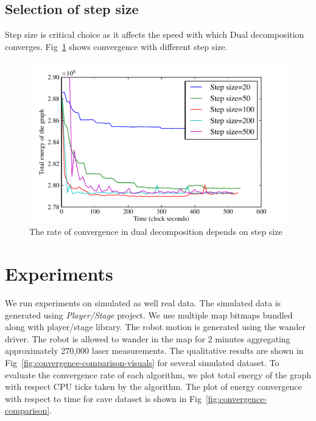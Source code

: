 \documentclass[letterpaper, 10 pt, conference]{ieeeconf} %
\begin{document}
\subsection{Selection of step size}
Step size is critical choice as it affects the speed with which Dual decomposition converges. Fig~\ref{fig:dualdecomposition-stepsize} shows convergence with different step size.
\begin{figure}
  \includegraphics[width=\columnwidth]{../figures/dualdecomposition-stepsize-inc500.pdf}
  \caption{The rate of convergence in dual decomposition depends on step size}
  \label{fig:dualdecomposition-stepsize}
\end{figure}

\section{Experiments} 
We run experiments on simulated as well real data.
The simulated data is generated using \emph{Player/Stage} \cite{gerkey2003player}
project. We use multiple map bitmaps bundled along with player/stage library.
The robot motion is generated using the wander driver. The robot is allowed to
wander in the map for 2 minutes aggregating approximately 270,000 laser measurements.
The qualitative results are shown in
Fig~\ref{fig:convergence-comparison-visuals} for several simulated dataset. To evaluate the
convergence rate of each algorithm, we plot total energy of the graph with
respect CPU ticks taken by the algorithm. The plot of energy convergence with respect to time for cave dataset is shown in Fig~\ref{fig:convergence-comparison}.
\end{document}
